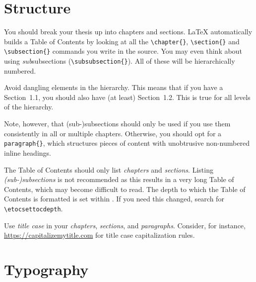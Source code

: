 \section{Structure}

You should break your thesis up into chapters and sections. LaTeX automatically builds a Table of Contents by looking at all the \verb|\chapter{}|, \verb|\section{}|  and \verb|\subsection{}| commands you write in the source. You may even think about using \emph{sub}subsections (\verb|\subsubsection{}|). All of these will be hierarchically numbered.

Avoid dangling elements in the hierarchy. This means that if you have a Section~1.1, you should also have (at least) Section~1.2. This is true for all levels of the hierarchy.

Note, however, that (sub-)subsections should only be used if you use them consistently in all or multiple chapters. Otherwise, you should opt for a \verb|paragraph{}|, which structures pieces of content with unobtrusive non-numbered inline headings.

The Table of Contents should only list \emph{chapters} and \emph{sections}. Listing \emph{(sub-)subsections} is not recommended as this results in a very long Table of Contents, which may become difficult to read. The depth to which the Table of Contents is formatted is set within . If you need this changed, search for \texttt{\textbackslash etocsettocdepth}.

Use \emph{title case} in your \emph{chapters}, \emph{sections}, and \emph{paragraphs}. Consider, for instance, \url{https://capitalizemytitle.com} for title case capitalization rules.


\section{Typography}

